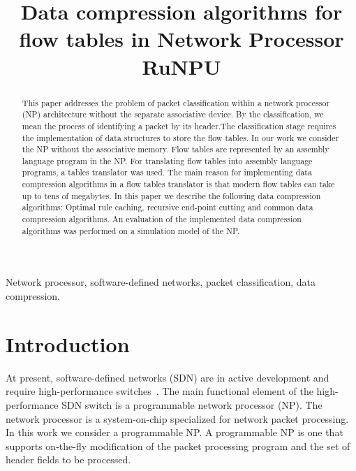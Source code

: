 \documentclass[conference]{IEEEtran}
\begin{document}
\author{
    \and
    }
\title{
    Data compression algorithms for flow tables in Network Processor RuNPU
}
\maketitle
    \begin{abstract}
        This   paper   addresses   the   problem   of   packet classification  within  a  network  processor  (NP)  
        architecture without the separate associative device. By the classification, we  mean  the  process  of  
        identifying  a  packet  by  its  header.The classification stage requires the implementation of data 
        structures  to  store  the  flow  tables.  In  our  work  we  consider the  NP  without  the  associative  memory.  
        Flow  tables  are represented by an assembly language program in the NP. For translating  flow  tables  into  assembly  
        language  programs,  a tables translator was used. The main reason for implementing data  compression  algorithms  in  a  
        flow  tables  translator  is that  modern  flow  tables  can  take  up  to  tens  of  megabytes. In  this  paper  we  
        describe  the  following  data  compression algorithms: Optimal rule caching, recursive end-point cutting and common data compression algorithms. 
        An evaluation of the implemented data compression algorithms was performed on a simulation model of the NP.
    \end{abstract}
    
    \begin{IEEEkeywords}
        Network processor, software-defined networks, packet classification, data compression.
    \end{IEEEkeywords}

    \section{Introduction}
        At present, software-defined networks (SDN) are in active development and require high-performance switches~\cite{smel2012open}.
        The main functional element of the high-performance SDN switch is a programmable network processor (NP). 
        The network processor is a system-on-chip specialized for network packet processing. 
        In this work we consider a programmable NP. A programmable NP is one that supports on-the-fly modification of the packet 
        processing program and the set of header fields to be processed. 
\end{document}
